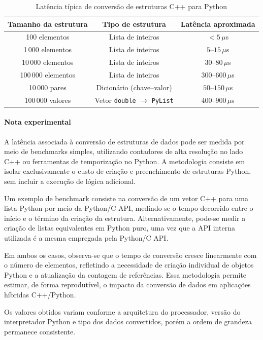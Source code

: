 \begin{table}[h]
\centering
\caption{Latência típica de conversão de estruturas C++ para Python}
\begin{tabular}{|c|c|c|}
\hline
\textbf{Tamanho da estrutura} & \textbf{Tipo de estrutura} & \textbf{Latência aproximada} \\
\hline
100 elementos & Lista de inteiros & $< 5\,\mu$s \\
\hline
1\,000 elementos & Lista de inteiros & $5$–$15\,\mu$s \\
\hline
10\,000 elementos & Lista de inteiros & $30$–$80\,\mu$s \\
\hline
100\,000 elementos & Lista de inteiros & $300$–$600\,\mu$s \\
\hline
10\,000 pares & Dicionário (chave–valor) & $50$–$150\,\mu$s \\
\hline
100\,000 valores & Vetor \texttt{double} $\rightarrow$ \texttt{PyList} & $400$–$900\,\mu$s \\
\hline
\end{tabular}
\end{table}

\paragraph{Nota experimental}

A latência associada à conversão de estruturas de dados pode ser medida por meio de benchmarks simples, utilizando contadores de alta resolução no lado C++ ou ferramentas de temporização no Python. A metodologia consiste em isolar exclusivamente o custo de criação e preenchimento de estruturas Python, sem incluir a execução de lógica adicional.

Um exemplo de benchmark consiste na conversão de um vetor C++ para uma lista Python por meio da Python/C API, medindo-se o tempo decorrido entre o início e o término da criação da estrutura. Alternativamente, pode-se medir a criação de listas equivalentes em Python puro, uma vez que a API interna utilizada é a mesma empregada pela Python/C API.

Em ambos os casos, observa-se que o tempo de conversão cresce linearmente com o número de elementos, refletindo a necessidade de criação individual de objetos Python e a atualização da contagem de referências. Essa metodologia permite estimar, de forma reprodutível, o impacto da conversão de dados em aplicações híbridas C++/Python.

Os valores obtidos variam conforme a arquitetura do processador, versão do interpretador Python e tipo dos dados convertidos, porém a ordem de grandeza permanece consistente.
     
